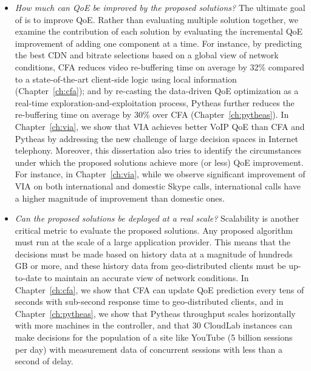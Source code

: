 \begin{itemize}

\item {\em How much can QoE be improved by the proposed solutions?}
The ultimate goal of \ddn is to improve QoE. 
Rather than evaluating multiple solution together, we examine the 
contribution of each solution by evaluating the incremental QoE 
improvement of adding one component at a time. 
For instance, by predicting the best CDN and bitrate selections based on 
a global view of network conditions, CFA reduces video re-buffering time 
on average by 32\% compared to a state-of-the-art client-side logic using 
local information (Chapter~\ref{ch:cfa});
and by re-casting the data-driven QoE optimization as a real-time 
exploration-and-exploitation process, Pytheas further reduces the 
re-buffering time on average by 30\% over CFA (Chapter~\ref{ch:pytheas}).
In Chapter~\ref{ch:via}, we show that VIA achieves better VoIP QoE
than CFA and Pytheas
by addressing the new challenge of large decision spaces in
Internet telephony.
Moreover, this dissertation also tries to identify the circumstances under which
the proposed solutions achieve more (or less) QoE improvement.
For instance, in Chapter~\ref{ch:via}, while 
we observe significant improvement of 
VIA on both international and domestic Skype calls, international calls
have a higher magnitude of improvement than domestic ones.



\item {\em Can the proposed solutions be deployed at a real scale?}
Scalability is another critical metric to evaluate the proposed solutions. 
Any proposed algorithm must run at the scale of a large application 
provider.
This means that the decisions must be made 
based on history data at a magnitude of hundreds GB or more, and 
these history data from geo-distributed 
clients must be up-to-date to maintain an accurate view of network conditions.
In Chapter~\ref{ch:cfa}, we show that CFA can update QoE 
prediction every tens of seconds with sub-second response 
time to geo-distributed clients, 
and in Chapter~\ref{ch:pytheas}, we show that Pytheas throughput 
scales horizontally with more machines in the controller, and that 
30 CloudLab instances can make decisions for the population of a site
like YouTube (5 billion sessions per day) with measurement data of 
concurrent sessions with less than a second of delay.


\end{itemize}
